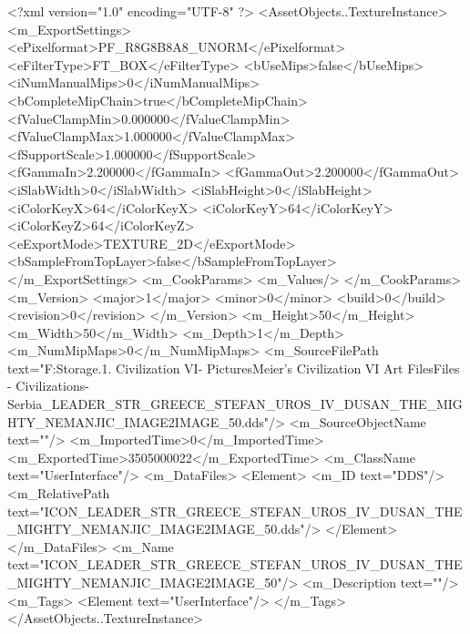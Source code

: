 <?xml version="1.0" encoding="UTF-8" ?>
<AssetObjects..TextureInstance>
	<m_ExportSettings>
		<ePixelformat>PF_R8G8B8A8_UNORM</ePixelformat>
		<eFilterType>FT_BOX</eFilterType>
		<bUseMips>false</bUseMips>
		<iNumManualMips>0</iNumManualMips>
		<bCompleteMipChain>true</bCompleteMipChain>
		<fValueClampMin>0.000000</fValueClampMin>
		<fValueClampMax>1.000000</fValueClampMax>
		<fSupportScale>1.000000</fSupportScale>
		<fGammaIn>2.200000</fGammaIn>
		<fGammaOut>2.200000</fGammaOut>
		<iSlabWidth>0</iSlabWidth>
		<iSlabHeight>0</iSlabHeight>
		<iColorKeyX>64</iColorKeyX>
		<iColorKeyY>64</iColorKeyY>
		<iColorKeyZ>64</iColorKeyZ>
		<eExportMode>TEXTURE_2D</eExportMode>
		<bSampleFromTopLayer>false</bSampleFromTopLayer>
	</m_ExportSettings>
	<m_CookParams>
		<m_Values/>
	</m_CookParams>
	<m_Version>
		<major>1</major>
		<minor>0</minor>
		<build>0</build>
		<revision>0</revision>
	</m_Version>
	<m_Height>50</m_Height>
	<m_Width>50</m_Width>
	<m_Depth>1</m_Depth>
	<m_NumMipMaps>0</m_NumMipMaps>
	<m_SourceFilePath text="F:\Mod Storage\2.1. Civilization VI\Mods\Archive - Pictures\Sid Meier's Civilization VI Art Files\Art Files - Civilizations\Civilization - Serbia\ICON_LEADER_STR_GREECE_STEFAN_UROS_IV_DUSAN_THE_MIGHTY_NEMANJIC_IMAGE2IMAGE_50.dds"/>
	<m_SourceObjectName text=""/>
	<m_ImportedTime>0</m_ImportedTime>
	<m_ExportedTime>3505000022</m_ExportedTime>
	<m_ClassName text="UserInterface"/>
	<m_DataFiles>
		<Element>
			<m_ID text="DDS"/>
			<m_RelativePath text="ICON_LEADER_STR_GREECE_STEFAN_UROS_IV_DUSAN_THE_MIGHTY_NEMANJIC_IMAGE2IMAGE_50.dds"/>
		</Element>
	</m_DataFiles>
	<m_Name text="ICON_LEADER_STR_GREECE_STEFAN_UROS_IV_DUSAN_THE_MIGHTY_NEMANJIC_IMAGE2IMAGE_50"/>
	<m_Description text=""/>
	<m_Tags>
		<Element text="UserInterface"/>
	</m_Tags>
</AssetObjects..TextureInstance>

